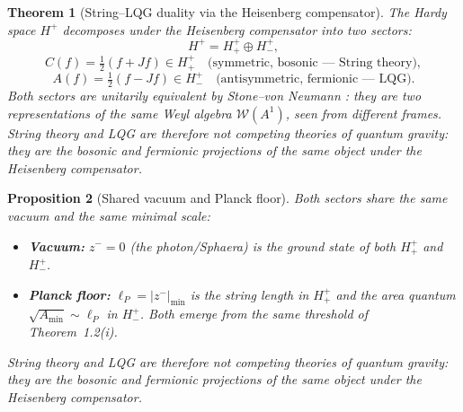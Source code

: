 \documentclass[12pt,a4paper]{article}
\newtheorem{theorem}{Theorem}[section]
\newtheorem{proposition}[theorem]{Proposition}
\newcommand{\lP}{\ell_P}
\newcommand{\zminus}{z^-}
\newcommand{\Hplus}{H^+}
\newcommand{\Hplusplus}{H^+_+}
\newcommand{\Hplusminus}{H^+_-}
\newcommand{\WA}{\mathcal{W}(A^1)}
\begin{document}
\begin{theorem}[String--LQG duality via the Heisenberg compensator]
The Hardy space $\Hplus$ decomposes under the Heisenberg compensator
into two sectors:
\[
  \Hplus = \Hplusplus\oplus\Hplusminus,
\]
\[
  C(f) = \tfrac{1}{2}(f+Jf)\in\Hplusplus
  \quad\text{(symmetric, bosonic --- String theory)},
\]
\[
  A(f) = \tfrac{1}{2}(f-Jf)\in\Hplusminus
  \quad\text{(antisymmetric, fermionic --- LQG)}.
\]
Both sectors are unitarily equivalent by Stone--von Neumann
\cite{brendecke2026rh}: they are two representations of the same
Weyl algebra $\WA$, seen from different frames.
String theory and LQG are therefore not competing theories of quantum
gravity: they are the bosonic and fermionic projections of the same
object under the Heisenberg compensator.
\end{theorem}

\begin{proposition}[Shared vacuum and Planck floor]
Both sectors share the same vacuum and the same minimal scale:
\begin{itemize}
  \item \textbf{Vacuum:} $\zminus=0$ (the photon/Sphaera) is the ground
        state of both $\Hplusplus$ and $\Hplusminus$.
  \item \textbf{Planck floor:} $\lP=|\zminus|_{\min}$ is the string
        length in $\Hplusplus$ and the area quantum
        $\sqrt{A_{\min}}\sim\lP$ in $\Hplusminus$.
        Both emerge from the same threshold of Theorem~1.2(i).
\end{itemize}
String theory and LQG are therefore not competing theories of quantum
gravity: they are the bosonic and fermionic projections of the same
object under the Heisenberg compensator.
\end{proposition}
\end{document}
